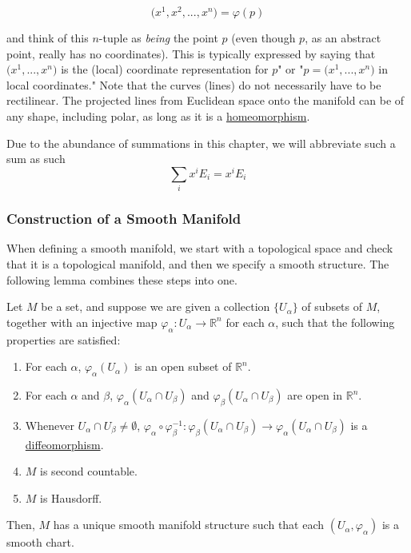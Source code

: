 \documentclass{article}
\newcounter{definition}[section]
\begin{document}
        \begin{equation}
          \big( x^1, x^2, ..., x^n \big) = \varphi(p)
        \end{equation}

      and think of this $n$-tuple as \textit{being} the point $p$ (even though $p$, as an abstract point, really has no coordinates). This is typically expressed by saying that $\big( x^1, ..., x^n\big)$ is the (local) coordinate representation for $p$" or "$p = \big( x^1, ..., x^n\big)$ in local coordinates." Note that the curves (lines) do not necessarily have to be rectilinear. The projected lines from Euclidean space onto the manifold can be of any shape, including polar, as long as it is a \hyperref[pst-def:homeomorphism]{homeomorphism}. 

      \begin{definition}
        \label{def:einstein-summation-notation}
        Due to the abundance of summations in this chapter, we will abbreviate such a sum as such 
          \begin{equation}
            \sum_i x^i E_i = x^i E_i
          \end{equation}
      \end{definition}

    \subsubsection{Construction of a Smooth Manifold}

      When defining a smooth manifold, we start with a topological space and check that it is a topological manifold, and then we specify a smooth structure. The following lemma combines these steps into one. 

      \begin{lemma}
        \label{thm:smooth-manifold-construction-lemma}
        Let $M$ be a set, and suppose we are given a collection $\{U_\alpha\}$ of subsets of $M$, together with an injective map $\varphi_\alpha: U_\alpha \to \mathbb{R}^n$ for each $\alpha$, such that the following properties are satisfied:
        \begin{enumerate}
          \item For each $\alpha$, $\varphi_\alpha (U_\alpha)$ is an open subset of $\mathbb{R}^n$.
          \item For each $\alpha$ and $\beta$, $\varphi_\alpha (U_\alpha \cap U_\beta)$ and $\varphi_\beta (U_\alpha \cap U_\beta)$ are open in $\mathbb{R}^n$. 
          \item Whenever $U_\alpha \cap U_\beta \neq \emptyset$, $\varphi_\alpha \circ \varphi_\beta^{-1}: \varphi_\beta (U_\alpha \cap U_\beta) \to \varphi_\alpha (U_\alpha \cap U_\beta)$ is a \hyperref[def:diffeomorphism]{diffeomorphism}. 
          \item $M$ is second countable. 
          \item $M$ is Hausdorff. 
        \end{enumerate}
        Then, $M$ has a unique smooth manifold structure such that each $(U_\alpha, \varphi_\alpha)$ is a smooth chart. 
      \end{lemma}
\end{document}
